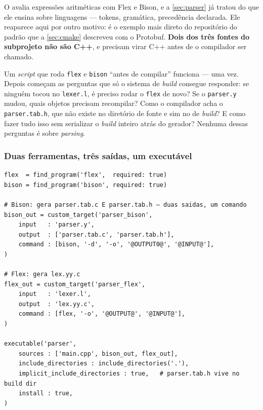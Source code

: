 O  avalia expressões aritméticas com Flex e Bison, e a
\cref{sec:parser} já tratou do que ele ensina sobre linguagens --- tokens,
gramática, precedência declarada. Ele reaparece aqui por outro motivo: é o
exemplo mais direto do repositório do padrão que a
\cref{sec:cmake} descreveu com o Protobuf. \textbf{Dois dos três fontes do
subprojeto não são C++}, e precisam virar C++ antes de o compilador ser
chamado.

\begin{porque}
Um \emph{script} que roda \texttt{flex} e \texttt{bison} ``antes de compilar''
funciona --- uma vez. Depois começam as perguntas que só o sistema de
\emph{build} consegue responder: se ninguém tocou no \texttt{lexer.l}, é preciso
rodar o \texttt{flex} de novo? Se o \texttt{parser.y} mudou, quais objetos
precisam recompilar? Como o compilador acha o \texttt{parser.tab.h}, que não
existe no diretório de fonte e sim no de \emph{build}? E como fazer tudo isso
sem serializar o \emph{build} inteiro atrás do gerador? Nenhuma dessas
perguntas é sobre \emph{parsing}.
\end{porque}

\subsubsection{Duas ferramentas, três saídas, um executável}

\begin{lstlisting}[style=bt, language=Meson,
    caption={\texttt{src/parser/meson.build}, na íntegra --- o \emph{pipeline}
             de geração completo em vinte linhas.}]
flex  = find_program('flex',  required: true)
bison = find_program('bison', required: true)

# Bison: gera parser.tab.c E parser.tab.h — duas saidas, um comando
bison_out = custom_target('parser_bison',
    input   : 'parser.y',
    output  : ['parser.tab.c', 'parser.tab.h'],
    command : [bison, '-d', '-o', '@OUTPUT0@', '@INPUT@'],
)

# Flex: gera lex.yy.c
flex_out = custom_target('parser_flex',
    input   : 'lexer.l',
    output  : 'lex.yy.c',
    command : [flex, '-o', '@OUTPUT@', '@INPUT@'],
)

executable('parser',
    sources : ['main.cpp', bison_out, flex_out],
    include_directories : include_directories('.'),
    implicit_include_directories : true,   # parser.tab.h vive no build dir
    install : true,
)
\end{lstlisting}

